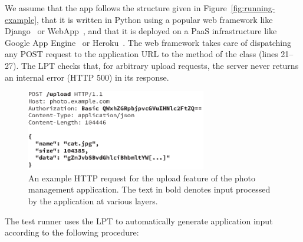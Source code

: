 We assume that the app follows the structure given in Figure~\ref{fig:running-example}, that it is written in Python using a popular web framework like Django~\cite{py-django} or WebApp~\cite{webapp2}, and that it is deployed on a PaaS infrastructure like Google App Engine~\cite{google-gae} or Heroku~\cite{heroku}.  The web framework takes care of dispatching any POST request to the  application URL to the  method of the  class (lines 21--27).
%
The  LPT checks that, for arbitrary upload requests, the server never returns an internal error (HTTP 500) in its response.

\begin{figure}
  \centering
  \includegraphics[width=0.7\textwidth]{paas/figures/http-packet}
  \caption{An example HTTP request for the upload feature of the photo
    management application.  The text in bold denotes input processed
    by the application at various layers.}
  \label{fig:http-packet}
\end{figure}

The test runner uses the LPT to automatically generate application
input according to the following procedure:

